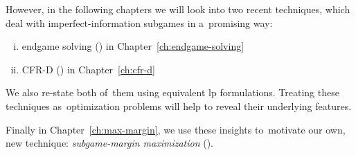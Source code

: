 However, in the following chapters we will look into two recent techniques, which deal with imperfect-information subgames in a~promising way:
\begin{enumerate}[(i)]
  \item endgame solving (\cite{GanzfriedSandholm13improving}) in Chapter~\ref{ch:endgame-solving}
  \item CFR-D (\cite{BurchJohansonBowling13}) in Chapter~\ref{ch:cfr-d}
\end{enumerate}
We also re-state both of~them using equivalent \acrshort{lp} formulations.
Treating these techniques as~optimization problems will help to reveal their underlying features.

Finally in Chapter~\ref{ch:max-margin}, we use these insights to~motivate our own, new technique: \emph{subgame-margin maximization} (\cite{Moravcik2016refining}).
